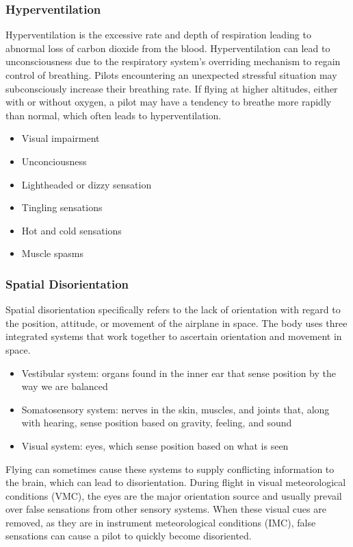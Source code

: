 \documentclass[12pt]{article}
\begin{document}
		\subsubsection{Hyperventilation}
			Hyperventilation is the excessive rate and depth of respiration leading to abnormal loss of carbon dioxide from the blood. Hyperventilation can lead to unconsciousness due to the respiratory system’s overriding mechanism to regain control of breathing. Pilots encountering an unexpected stressful situation may subconsciously increase their breathing rate. If flying at higher altitudes, either with or without oxygen, a pilot may have a tendency to breathe more rapidly than normal, which often leads to hyperventilation.
			\begin{multicols}{2}
			\begin{itemize}
				\item Visual impairment
				\item Unconciousness 
				\item Lightheaded or dizzy sensation
				\item Tingling sensations
				\item Hot and cold sensations
				\item Muscle spasms
			\end{itemize}
			\end{multicols}
		\subsubsection{Spatial Disorientation}
			Spatial disorientation specifically refers to the lack of orientation with regard to the position, attitude, or movement of the airplane in space. The body uses three integrated systems that work together to ascertain orientation and movement in space.
			\begin{itemize}
				\item Vestibular system: organs found in the inner ear that sense position by the way we are balanced
				\item Somatosensory system: nerves in the skin, muscles, and joints that, along with hearing, sense position based on gravity, feeling, and sound
				\item Visual system: eyes, which sense position based on what is seen
			\end{itemize}

			Flying can sometimes cause these systems to supply conflicting information to the brain, which can lead to disorientation. During flight in visual meteorological conditions (VMC), the eyes are the major orientation source and usually prevail over false sensations from other sensory systems. When these visual cues are removed, as they are in instrument meteorological conditions (IMC), false sensations can cause a pilot to quickly become disoriented.
\end{document}
